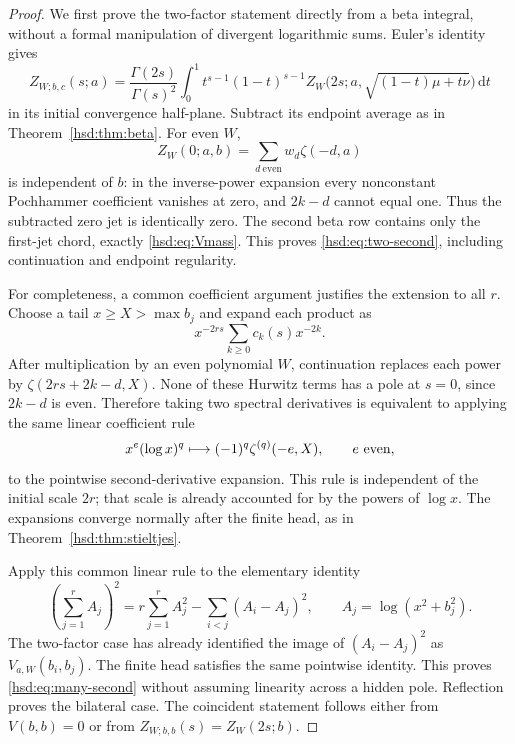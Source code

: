 \documentclass[11pt]{article}
\numberwithin{equation}{section}
\theoremstyle{definition}\newtheorem{definition}[theorem]{Definition}
\theoremstyle{remark}\newtheorem{remark}[theorem]{Remark}
\newcommand{\dd}{\,\mathrm d}
\begin{document}
\begin{proof}
We first prove the two-factor statement directly from a beta integral,
without a formal manipulation of divergent logarithmic sums. Euler's
identity gives
\[
 Z_{W;b,c}(s;a)=\frac{\Gamma(2s)}{\Gamma(s)^2}
 \int_0^1t^{s-1}(1-t)^{s-1}
 Z_W\bigl(2s;a,\sqrt{(1-t)\mu+t\nu}\bigr)\dd t
\]
in its initial convergence half-plane. Subtract its endpoint average
as in Theorem~\ref{hsd:thm:beta}. For even $W$,
\begin{equation}\label{hsd:eq:quadraticzero}
 Z_W(0;a,b)=\sum_{d\ \mathrm{even}}w_d\zeta(-d,a)
\end{equation}
is independent of $b$: in the inverse-power expansion every nonconstant
Pochhammer coefficient vanishes at zero, and $2k-d$ cannot equal one.
Thus the subtracted zero jet is identically zero. The second beta row
contains only the first-jet chord, exactly \eqref{hsd:eq:Vmass}.
This proves \eqref{hsd:eq:two-second}, including continuation and endpoint
regularity.

For completeness, a common coefficient argument justifies the extension
to all $r$. Choose a tail $x\ge X>\max b_j$ and expand each product as
\[
 x^{-2rs}\sum_{k\ge0}c_k(s)x^{-2k}.
\]
After multiplication by an even polynomial $W$, continuation replaces
each power by $\zeta(2rs+2k-d,X)$. None of these Hurwitz terms has a pole
at $s=0$, since $2k-d$ is even. Therefore taking two spectral derivatives
is equivalent to applying the same linear coefficient rule
\[
 x^e(\log x)^q\longmapsto(-1)^q\zeta^{(q)}(-e,X),
 \qquad e\ \hbox{even},
\]
to the pointwise second-derivative expansion. This rule is independent
of the initial scale $2r$; that scale is already accounted for by the
powers of $\log x$. The expansions converge normally after the finite
head, as in Theorem~\ref{hsd:thm:stieltjes}.

Apply this common linear rule to the elementary identity
\[
 \left(\sum_{j=1}^r A_j\right)^2
   =r\sum_{j=1}^r A_j^2-\sum_{i<j}(A_i-A_j)^2,
 \qquad A_j=\log(x^2+b_j^2).
\]
The two-factor case has already identified the image of
$(A_i-A_j)^2$ as $V_{a,W}(b_i,b_j)$. The finite head satisfies the same
pointwise identity. This proves \eqref{hsd:eq:many-second} without
assuming linearity across a hidden pole. Reflection proves the bilateral
case. The coincident statement follows either from $V(b,b)=0$ or from
$Z_{W;b,b}(s)=Z_W(2s;b)$.
\end{proof}
\end{document}
